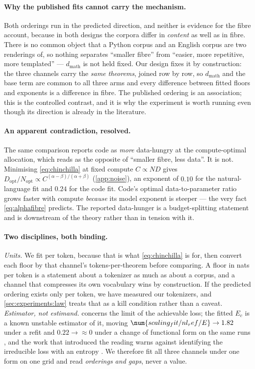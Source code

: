 \paragraph{Why the published fits cannot carry the mechanism.}
Both orderings run in the predicted direction, and neither is evidence for the
fibre account, because in both designs the corpora differ in \emph{content} as
well as in fibre.
There is no common object that a Python corpus and an English corpus are two
renderings of, so nothing separates ``smaller fibre'' from ``easier, more
repetitive, more templated'' --- \(d_{\mathrm{math}}\) is not held fixed.
Our design fixes it by construction:
the three channels carry the \emph{same theorems}, joined row by row, so
\(d_{\mathrm{math}}\) and the base term are common to all three arms and every
difference between fitted floors and exponents is a difference in fibre.
The published ordering is an association;
this is the controlled contrast, and it is why the experiment is worth running
even though its direction is already in the literature.

\paragraph{An apparent contradiction, resolved.}
The same comparison reports code as \emph{more} data-hungry at the
compute-optimal allocation, which reads as the opposite of ``smaller fibre, less
data''.
It is not.
Minimising \cref{eq:chinchilla} at fixed compute \(C \propto ND\) gives
\(D_{\mathrm{opt}}/N_{\mathrm{opt}} \propto
C^{(\alpha-\beta)/(\alpha+\beta)}\) (\cref{app:noise}), an exponent of
\(0.10\) for the natural-language fit and \(0.24\) for the code fit.
Code's optimal data-to-parameter ratio grows faster with compute \emph{because}
its model exponent is steeper --- the very fact \cref{eq:alphafibre} predicts.
The reported data-hunger is a budget-splitting statement and is downstream of
the theory rather than in tension with it.

\paragraph{Two disciplines, both binding.}
\emph{Units.}
We fit per token, because that is what \cref{eq:chinchilla} is for, then convert
each floor by that channel's tokens-per-theorem before comparing.
A floor in nats per token is a statement about a tokenizer as much as about a
corpus, and a channel that compresses its own vocabulary wins by construction.
If the predicted ordering exists only per token, we have measured our
tokenizers, and \cref{sec:experiments:law} treats that as a kill condition
rather than a caveat.
\emph{Estimator, not estimand.}
 concerns the limit of the achievable loss;
the fitted \(E_c\) is a known unstable estimator of it, moving
\(\num{scaling_fit/nl_ref/E} \to 1.82\) under a refit \citep{besiroglu2024chinchilla} and
\(0.22 \to \approx 0\) under a change of functional form on the same runs
\citep{luo2025codescalingdatahungry}, and the work that introduced the reading
warns against identifying the irreducible loss with an entropy
\citep{henighan2020scaling}.
We therefore fit all three channels under one form on one grid and read
\emph{orderings and gaps}, never a value.

